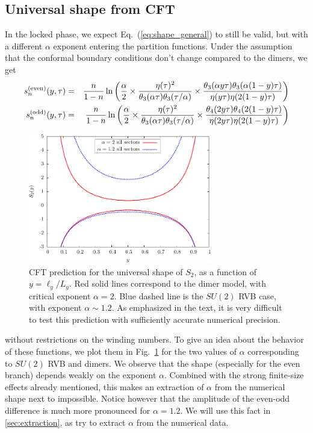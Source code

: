 \documentclass[11pt]{iopart}
\begin{document}
\subsection{Universal shape from CFT}
\label{sec:universal_shape}
In the locked phase, we expect Eq.~(\ref{eq:shape_general}) to still be valid, but with a different $\alpha$ exponent entering the partition functions. Under the assumption that the conformal boundary conditions don't change compared to the dimers, we get 
\begin{eqnarray}\label{eq:cft_prediction_gen}
 s_n^{\rm (even)}(y,\tau)&=&\frac{n}{1-n}\ln \left(\frac{\alpha}{2}\times\frac{\eta(\tau)^2}{\theta_3(\alpha\tau)\theta_3(\tau/\alpha)}\times\frac{\theta_3(\alpha y \tau)\theta_3(\alpha(1-y)\tau)}{\eta(y\tau)\eta(2(1-y)\tau)}\right)\\
 s_n^{\rm (odd)}(y,\tau)&=&\frac{n}{1-n}\ln \left(\frac{\alpha}{2}\times\frac{\eta(\tau)^2}{\theta_3(\alpha\tau)\theta_3(\tau/\alpha)}\times\frac{\theta_4(2y \tau)\theta_4(2(1-y)\tau)}{\eta(2y\tau)\eta(2(1-y)\tau)}\right)
\end{eqnarray}
\begin{figure}[ht]
 \begin{center}
  \includegraphics[width=8cm]{./figures/SUN_CFT.pdf}
 \end{center}
\caption{CFT prediction for the universal shape of $S_2$, as a function of $y=\ell_y/L_y$. Red solid lines correspond to the dimer model, with critical exponent $\alpha=2$. Blue dashed line is the $SU(2)$ RVB case, with exponent $\alpha\sim 1.2$. As emphasized in the text, it is very difficult to test this prediction with sufficiently accurate numerical precision.}
\label{fig:SUN_CFT}
\end{figure}
without restrictions on the winding numbers. To give an idea about the behavior of these functions, we plot them in Fig.~\ref{fig:SUN_CFT} for the two values of $\alpha$ corresponding to $SU(2)$ RVB and dimers. We observe that the shape (especially for the even branch) depends weakly on the exponent $\alpha$. Combined with the strong finite-size effects already mentioned, this makes an extraction of $\alpha$ from the numerical shape next to impossible. Notice however that the amplitude of the even-odd difference is much more pronounced for $\alpha=1.2$. We will use this fact in \ref{sec:extraction}, as try to extract $\alpha$ from the numerical data. 
\end{document}
